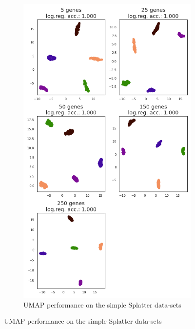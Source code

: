 \begin{figure}[h]
\begin{subfigure}{.3\textwidth}
  \includegraphics[width=\linewidth]{figs/UMAP_simple.png}
  \caption{\small UMAP performance on the simple Splatter data-sets}
  \label{fig:umap_simple}
\end{subfigure}


\end{figure}
